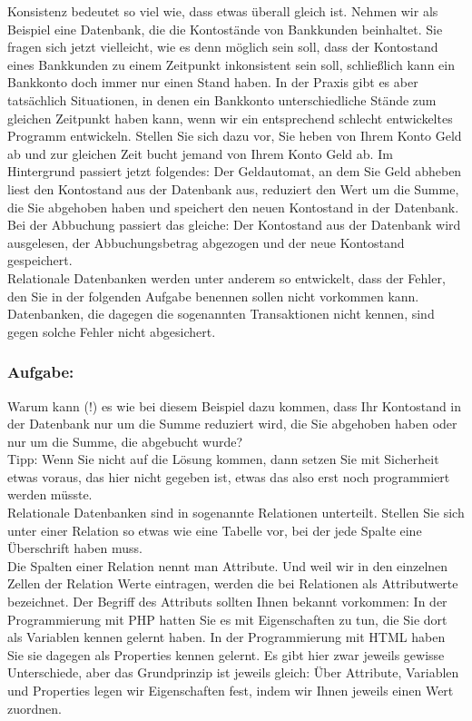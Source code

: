 Konsistenz bedeutet so viel wie, dass etwas überall gleich ist. Nehmen wir als Beispiel eine Datenbank, die die Kontostände von Bankkunden beinhaltet. Sie fragen sich jetzt vielleicht, wie es denn möglich sein soll, dass der Kontostand eines Bankkunden zu einem Zeitpunkt inkonsistent sein soll, schließlich kann ein  Bankkonto doch immer nur einen Stand haben. In der Praxis gibt es aber tatsächlich Situationen, in denen ein Bankkonto unterschiedliche Stände zum gleichen Zeitpunkt haben kann, wenn wir ein entsprechend schlecht entwickeltes Programm entwickeln. Stellen Sie sich dazu vor, Sie heben von Ihrem Konto Geld ab und zur gleichen Zeit bucht jemand von Ihrem Konto Geld ab. Im Hintergrund passiert jetzt folgendes: Der Geldautomat, an dem Sie Geld abheben liest den Kontostand aus der Datenbank aus, reduziert den Wert um die Summe, die Sie abgehoben haben und speichert den neuen Kontostand in der Datenbank. Bei der Abbuchung passiert das gleiche: Der Kontostand aus der Datenbank wird ausgelesen, der Abbuchungsbetrag abgezogen und der neue Kontostand gespeichert.\\

Relationale Datenbanken werden unter anderem so entwickelt, dass der Fehler, den Sie in der folgenden Aufgabe benennen sollen nicht vorkommen kann. Datenbanken, die dagegen die sogenannten Transaktionen nicht kennen, sind gegen solche Fehler nicht abgesichert.

\subsubsection{Aufgabe:}

Warum kann (!) es wie bei diesem Beispiel dazu kommen, dass Ihr Kontostand in der Datenbank nur um die Summe reduziert wird, die Sie abgehoben haben oder nur um die Summe, die abgebucht wurde?\\

Tipp: Wenn Sie nicht auf die Lösung kommen, dann setzen Sie mit Sicherheit etwas voraus, das hier nicht gegeben ist, etwas das also erst noch programmiert werden müsste.\\

Relationale Datenbanken sind in sogenannte Relationen unterteilt. Stellen Sie sich unter einer Relation so etwas wie eine Tabelle vor, bei der jede Spalte eine Überschrift haben muss.\\

Die Spalten einer Relation nennt man Attribute. Und weil wir in den einzelnen Zellen der Relation Werte eintragen, werden die bei Relationen als Attributwerte bezeichnet. Der Begriff des Attributs sollten Ihnen bekannt vorkommen: In der Programmierung mit PHP hatten Sie es mit Eigenschaften zu tun, die Sie dort als Variablen kennen gelernt haben. In der Programmierung mit HTML haben Sie sie dagegen als Properties kennen gelernt. Es gibt hier zwar jeweils gewisse Unterschiede, aber das Grundprinzip ist jeweils gleich: Über Attribute, Variablen und Properties legen wir Eigenschaften fest, indem wir Ihnen jeweils einen Wert zuordnen.\\


